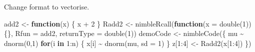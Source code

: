 \documentclass[
  12pt,
]{krantz}
\newenvironment{Shaded}{\begin{snugshade}}{\end{snugshade}}
\newcommand{\AttributeTok}[1]{\textcolor[rgb]{0.77,0.63,0.00}{#1}}
\newcommand{\ControlFlowTok}[1]{\textcolor[rgb]{0.13,0.29,0.53}{\textbf{#1}}}
\newcommand{\DecValTok}[1]{\textcolor[rgb]{0.00,0.00,0.81}{#1}}
\newcommand{\FunctionTok}[1]{\textcolor[rgb]{0.00,0.00,0.00}{#1}}
\newcommand{\NormalTok}[1]{#1}
\newcommand{\OtherTok}[1]{\textcolor[rgb]{0.56,0.35,0.01}{#1}}
\newcommand{\SpecialCharTok}[1]{\textcolor[rgb]{0.00,0.00,0.00}{#1}}
\newcommand{\StringTok}[1]{\textcolor[rgb]{0.31,0.60,0.02}{#1}}
\begin{document}
Change format to vectorise.

\begin{Shaded}
\begin{Highlighting}[]
\NormalTok{add2 }\OtherTok{\textless{}{-}} \ControlFlowTok{function}\NormalTok{(x) \{}
\NormalTok{   x }\SpecialCharTok{+} \DecValTok{2} 
\NormalTok{\}}
\NormalTok{Radd2 }\OtherTok{\textless{}{-}} \FunctionTok{nimbleRcall}\NormalTok{(}\ControlFlowTok{function}\NormalTok{(}\AttributeTok{x =} \FunctionTok{double}\NormalTok{(}\DecValTok{1}\NormalTok{))\{\}, }
                     \AttributeTok{Rfun =} \StringTok{\textquotesingle{}add2\textquotesingle{}}\NormalTok{,}
                     \AttributeTok{returnType =} \FunctionTok{double}\NormalTok{(}\DecValTok{1}\NormalTok{))}
\NormalTok{demoCode }\OtherTok{\textless{}{-}} \FunctionTok{nimbleCode}\NormalTok{(\{}
\NormalTok{  mu }\SpecialCharTok{\textasciitilde{}} \FunctionTok{dnorm}\NormalTok{(}\DecValTok{0}\NormalTok{,}\DecValTok{1}\NormalTok{)}
  \ControlFlowTok{for}\NormalTok{(i }\ControlFlowTok{in} \DecValTok{1}\SpecialCharTok{:}\NormalTok{n) \{}
\NormalTok{    x[i] }\SpecialCharTok{\textasciitilde{}} \FunctionTok{dnorm}\NormalTok{(mu, }\AttributeTok{sd =} \DecValTok{1}\NormalTok{)}
\NormalTok{    \}}
\NormalTok{    z[}\DecValTok{1}\SpecialCharTok{:}\DecValTok{4}\NormalTok{] }\OtherTok{\textless{}{-}} \FunctionTok{Radd2}\NormalTok{(x[}\DecValTok{1}\SpecialCharTok{:}\DecValTok{4}\NormalTok{])}
\NormalTok{\})}


\end{Highlighting}
\end{Shaded}
\end{document}
